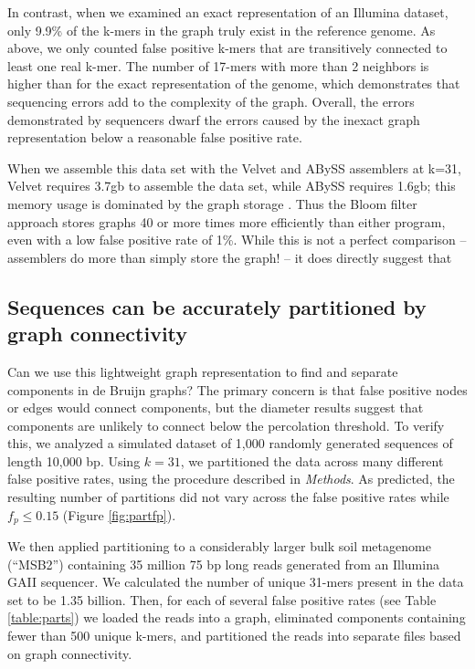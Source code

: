 \documentclass{pnastwo}
\begin{document}
\begin{article}
In contrast, when we examined an exact representation of an Illumina
dataset, only 9.9\% of the k-mers in the graph truly exist in the
reference genome.  As above, we only counted false positive k-mers
that are transitively connected to least one real k-mer. The number of
17-mers with more than 2 neighbors is higher than for the exact
representation of the genome, which demonstrates that sequencing
errors add to the complexity of the graph. Overall, the
errors demonstrated by sequencers dwarf the errors caused by the
inexact graph representation below a reasonable false positive rate.

When we assemble this data set with the Velvet and ABySS assemblers at
k=31, Velvet requires 3.7gb to assemble the data set,
while ABySS requires 1.6gb; this memory usage is dominated by the
graph storage \cite{zerbinothesis}. Thus the Bloom filter approach stores graphs 40 or
more times more efficiently than either program, even with a low false
positive rate of 1\%.  While this is not a perfect comparison -- assemblers do more than simply store the graph! -- it does directly suggest that 

\subsection{Sequences can be accurately partitioned by graph connectivity}


Can we use this lightweight graph representation to find and separate
components in de Bruijn graphs?  The primary concern is that false positive
nodes or edges would connect components, but the diameter results suggest that
components are unlikely to connect below the percolation
threshold. To verify this, we analyzed a simulated dataset of 1,000
randomly generated sequences of length 10,000 bp.  Using $k=31$,
we partitioned the data across many different false positive rates,
using the procedure described in \emph{Methods}. As predicted, the
resulting number of partitions did not vary across the false positive
rates while $f_p \le 0.15$ (Figure \ref{fig:partfp}).

We then applied partitioning to a considerably larger bulk soil
metagenome (``MSB2'') containing 35 million 75 bp long reads generated
from an Illumina GAII sequencer.  We calculated the number of unique
31-mers present in the data set to be 1.35 billion. Then, for each of
several false positive rates (see Table \ref{table:parts}) we loaded
the reads into a graph, eliminated components containing fewer than
500 unique k-mers, and partitioned the reads into separate files based
on graph connectivity.


\end{article}
\end{document}
